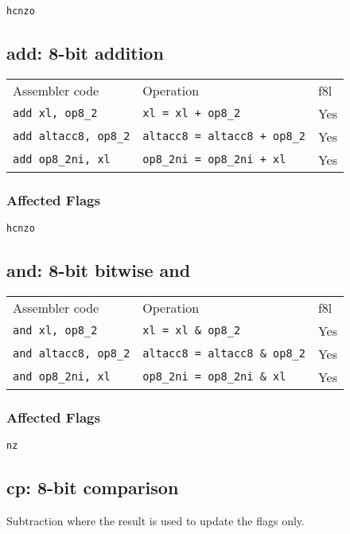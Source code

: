 \documentclass{book}
\begin{document}
\texttt{hcnzo}


\subsection{add: 8-bit addition}

\begin{tabular}{l l l}
Assembler code               & Operation                           & f8l \\
\texttt{add xl, op8\_2}      & \texttt{xl = xl + op8\_2}           & Yes \\
\texttt{add altacc8, op8\_2} & \texttt{altacc8 = altacc8 + op8\_2} & Yes \\
\texttt{add op8\_2ni, xl}    & \texttt{op8\_2ni = op8\_2ni + xl}   & Yes
\end{tabular}

\subsubsection*{Affected Flags}

\texttt{hcnzo}


\subsection{and: 8-bit bitwise and}

\begin{tabular}{l l l}
Assembler code               & Operation                            & f8l \\
\texttt{and xl, op8\_2}      & \texttt{xl = xl \& op8\_2}           & Yes \\
\texttt{and altacc8, op8\_2} & \texttt{altacc8 = altacc8 \& op8\_2} & Yes \\
\texttt{and op8\_2ni, xl}    & \texttt{op8\_2ni = op8\_2ni \& xl}   & Yes
\end{tabular}

\subsubsection*{Affected Flags}

\texttt{nz}


\subsection{cp: 8-bit comparison}

Subtraction where the result is used to update the flags only.
\end{document}
